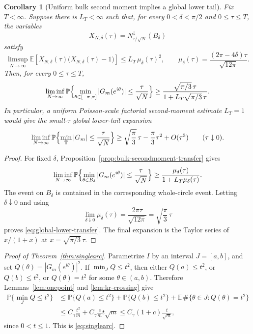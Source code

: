 \documentclass[11pt]{amsart}
\numberwithin{equation}{section}
\newtheorem{corollary}[theorem]{Corollary}
\theoremstyle{definition}
\theoremstyle{remark}
\newcommand{\T}{\mathbb T}
\newcommand{\Prob}{\mathbb P}
\newcommand{\Exp}{\mathbb E}
\begin{document}
\begin{corollary}[Uniform bulk second moment implies a global lower tail]
\label{cor:global-secondmoment-transfer}
Fix \(T<\infty\).  Suppose there is \(L_T<\infty\) such that, for every
\(0<\delta<\pi/2\) and \(0\le\tau\le T\), the variables
\[
  X_{N,\delta}(\tau)=N_{\tau/\sqrt N}^\downarrow(B_\delta)
\]
satisfy
\[
  \limsup_{N\to\infty}
  \Exp\!\left[
    X_{N,\delta}(\tau)\bigl(X_{N,\delta}(\tau)-1\bigr)
  \right]
  \le L_T\,\mu_\delta(\tau)^2,
  \qquad
  \mu_\delta(\tau)=\frac{(2\pi-4\delta)\tau}{\sqrt{12\pi}}.
\]
Then, for every \(0\le\tau\le T\),
\begin{equation}\label{eq:global-lower-transfer}
  \liminf_{N\to\infty}
  \Prob\Bigl\{
    \min_{\theta\in[-\pi,\pi]}|G_m(e^{i\theta})|
    \le \frac{\tau}{\sqrt N}
  \Bigr\}
  \ge
  \frac{\sqrt{\pi/3}\,\tau}
       {1+L_T\sqrt{\pi/3}\,\tau}.
\end{equation}
In particular, a uniform Poisson-scale factorial second-moment estimate
\(L_T=1\) would give the small-\(\tau\) global lower-tail expansion
\[
  \liminf_{N\to\infty}
  \Prob\Bigl\{
    \min_{\T}|G_m|
    \le \frac{\tau}{\sqrt N}
  \Bigr\}
  \ge
  \sqrt{\frac{\pi}{3}}\,\tau-\frac{\pi}{3}\tau^2+O(\tau^3)
  \qquad(\tau\downarrow0).
\]
\end{corollary}

\begin{proof}
For fixed \(\delta\), Proposition~\ref{prop:bulk-secondmoment-transfer} gives
\[
  \liminf_{N\to\infty}
  \Prob\Bigl\{
    \min_{\theta\in B_\delta}|G_m(e^{i\theta})|
    \le \frac{\tau}{\sqrt N}
  \Bigr\}
  \ge
  \frac{\mu_\delta(\tau)}
       {1+L_T\mu_\delta(\tau)}.
\]
The event on \(B_\delta\) is contained in the corresponding whole-circle event.
Letting \(\delta\downarrow0\) and using
\[
  \lim_{\delta\downarrow0}\mu_\delta(\tau)
  =
  \frac{2\pi\tau}{\sqrt{12\pi}}
  =
  \sqrt{\frac{\pi}{3}}\,\tau
\]
proves \eqref{eq:global-lower-transfer}.  The final expansion is the Taylor
series of \(x/(1+x)\) at \(x=\sqrt{\pi/3}\,\tau\).
\end{proof}

\begin{proof}[Proof of Theorem~\ref{thm:singlearc}]
Parametrize \(I\) by an interval \(J=[a,b]\), and set
\(Q(\theta)=|G_m(e^{i\theta})|^2\).  If \(\min_JQ\le t^2\), then either
\(Q(a)\le t^2\), or \(Q(b)\le t^2\), or \(Q(\theta)=t^2\) for some
\(\theta\in(a,b)\).  Therefore Lemmas~\ref{lem:onepoint} and
\ref{lem:kr-crossing} give
\[
\begin{aligned}
  \Prob\{\min_JQ\le t^2\}
  &\le \Prob\{Q(a)\le t^2\}+\Prob\{Q(b)\le t^2\}
      +\Exp\,\#\{\theta\in J:Q(\theta)=t^2\}  \\
  &\le C_\gamma\frac{t^2}{m}+C_\gamma\frac{c}{m}t\sqrt m
   \le C_\gamma(1+c)\frac{t}{\sqrt m},
\end{aligned}
\]
since \(0<t\le1\).  This is \eqref{eq:singlearc}.
\end{proof}
\end{document}
